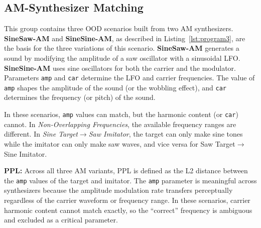 \documentclass{article}
\newcommand{\FMMod}{\textbf{SineSaw-AM}\xspace}
\newcommand{\FMModvtwo}{\textbf{SineSine-AM}\xspace}
\begin{document}
\subsection{AM-Synthesizer Matching}
\label{sec:am_sound_matching}

 This group contains three OOD scenarios built from two AM synthesizers.  \FMMod and \FMModvtwo, as described in Listing~\ref{lst:program3}, are the basis for the three variations of this scenario. \FMMod generates a sound by modifying the amplitude of a saw oscillator with a sinusoidal LFO. \FMModvtwo uses sine oscillators for both the carrier and the modulator. Parameters \texttt{amp} and \texttt{car} determine the LFO and carrier frequencies. The value of \texttt{amp} shapes the amplitude of the sound (or the wobbling effect), and \texttt{car} determines the frequency (or pitch) of the sound.

In these scenarios, \texttt{amp} values can match, but the harmonic content (or \texttt{car}) cannot. In \textit{Non-Overlapping Frequencies}, the available frequency ranges are different. In \textit{ Sine Target$\rightarrow$Saw Imitator}, the target can only make sine tones while the imitator can only make saw waves, and vice versa for Saw Target$\rightarrow$Sine Imitator. 



\noindent \textbf{PPL:} Across all three AM variants, PPL is defined as the L2 distance between the \texttt{amp} values of the target and imitator. The \texttt{amp} parameter is meaningful across synthesizers because the amplitude modulation rate transfers perceptually regardless of the carrier waveform or frequency range. In these scenarios, carrier harmonic content cannot match exactly, so the ``correct'' frequency is ambiguous and excluded as a critical parameter.


\end{document}
